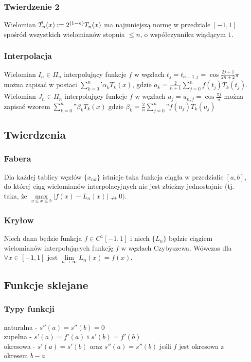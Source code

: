 \documentclass{article}
\begin{document}
\begin{minipage}[t]{.33\textwidth}
\subsubsection*{Twierdzenie 2}
Wielomian $\Tilde{T_n}(x) := 2^{(1-n)}T_n(x)$  ma najmniejszą normę w przedziale $[-1,1]$ spośród wszystkich wielomianów stopnia $\leq n$, o współczynniku wiądącym $1$.
\subsubsection*{Interpolacja}
Wielomian $I_n \in \Pi_n$ interpolujący funkcje $f$ w węzłach $t_j = t_{n+1,j} = \cos{\frac{2j+1}{2n+2}\pi}$
można zapisać w postaci $\sum_{k=0}^{n} \textbf{'} \alpha_k T_k(x)$, gdzie $a_k = \frac{2}{n+1}\sum_{j=0}^{n}f(t_j)T_k(t_j)$.
Wielomian $J_n \in \Pi_n$ interpolujący funkcje $f$ w węzłach $u_j = u_{n,j} = \cos{\frac{\pi j}{n}}$ można zapisać wzorem $\sum_{k=0}^{n}\textbf{''}\beta_kT_k(x)$
gdzie $\beta_k = \frac{2}{n}\sum\limits_{j=0}^{n}\textbf{''}f(u_j)T_k(u_j)$
\subsection*{Twierdzenia}
\subsubsection*{Fabera}
Dla każdej tablicy węzłów $\{x_{nk}\}$ istnieje taka funkcja ciągła w przedzialie $[a,b]$, do której ciąg wielomianów interpolacyjnych nie jest zbieżny jednostajnie (tj. taka, że $\max\limits_{a\leq x \leq b} |f(x) - L_n(x)| \nrightarrow 0).$
\subsubsection*{Kryłow}
Niech dana będzie funkcja $f \in C^1[-1,1]$ i niech $\{L_n\}$ będzie ciągiem wielomianów interpolujących funkcję $f$ w węzłach Czybyszewa. Wówczas dla $\forall x \in [-1,1]$ jest $\lim\limits_{n\rightarrow\infty}L_n(x) = f(x)$.
\subsection*{Funkcje sklejane}
\subsubsection*{Typy funkcji}
naturalna - $s''(a) = s''(b) = 0$ \\
zupełna  - $s'(a) = f'(a) \text{ i } s'(b) = f'(b)$ \\
okresowa - $s'(a) = s'(b) \text{ oraz } s''(a) = s''(b)$ jeśli $f$ jest okresowa z okresem $b-a$


\end{minipage}
\end{document}
